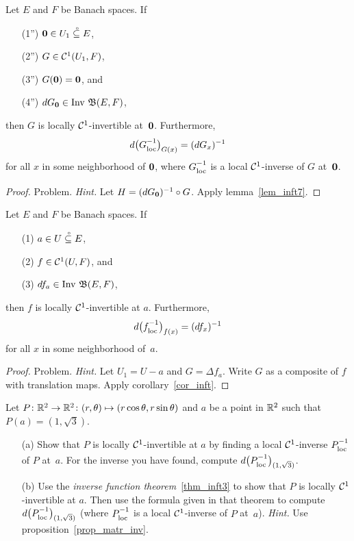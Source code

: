 \begin{cor}\label{cor_inft}
Let $E$ and $F$ be Banach spaces. If
 \begin{enumerate}
  \item[(1'')] $\mathbf{0} \in U_1\overset{\thickspace{}_\circ}{\subseteq}E$,
  \item[(2'')] $G \in \mathcal{C}^1(U_1,F)$,
  \item[(3'')] $G(\mathbf{0}) = \mathbf{0}$, and
  \item[(4'')] $dG_{\mathbf{0}} \in \operatorname{Inv}\,\mathfrak{B}(E,F)$,
 \end{enumerate}
then $G$ is locally $\mathcal{C}^1$-invertible at~$\mathbf{0}$.  Furthermore,
  \[ d\bigl(G_{\mathstrut\text{loc}}^{\mathstrut{-1}}\bigr)_{G(x)} = (dG_x)^{-1} \]
for all $x$ in some neighborhood of $\mathbf{0}$, where $G_{\mathstrut\text{loc}}^{\mathstrut{-1}}$ is a local $\mathcal{C}^1$-inverse
of $G$ at~$\mathbf{0}$.
\end{cor}

\begin{proof} Problem. \emph{Hint.}  Let $H = (dG_{\mathbf{0}})^{-1} \circ G$. Apply lemma~\ref{lem_inft7}.
\ns
\end{proof}

\begin{thm}\label{thm_inft3} Let $E$ and
$F$ be Banach spaces.  If
 \begin{enumerate}
  \item[(1)] $a \in U\overset{\thickspace{}_\circ}{\subseteq}E$,
  \item[(2)] $f \in \mathcal{C}^1(U,F)$, and
  \item[(3)] $df_a \in \operatorname{Inv}\,\mathfrak{B}(E,F)$,
 \end{enumerate}
then $f$ is locally $\mathcal{C}^1$-invertible at $a$.  Furthermore,
  \[ d\bigl(f_{\mathstrut\text{loc}}^{\mathstrut{-1}}\bigr)_{f(x)} = (df_x)^{-1} \]
for all $x$ in some neighborhood of~$a$.
\end{thm}

\begin{proof}  Problem.    \emph{Hint.}   Let $U_1 = U - a$ and $G = \Delta f_a$.  Write $G$ as a
composite of $f$ with translation maps.  Apply corollary~\ref{cor_inft}.   \ns
\end{proof}

\begin{prob} Let $P \colon \mathbb{R}^2 \rightarrow \mathbb{R}^2 \colon (r,\theta) \mapsto (r\cos\theta, r\sin\theta)$
and $a$ be a point in $\mathbb{R}^2$ such that $P(a) = (1, \sqrt 3)$.
 \begin{enumerate}
  \item[(a)] Show that $P$ is locally $\mathcal{C}^1$-invertible at $a$ by finding a local $\mathcal{C}^1$-inverse $P_{\mathstrut\text{loc}}^{\mathstrut{-1}}$ of $P$ at~$a$.  For the inverse you have found, compute
$d\bigl(P_{\mathstrut\text{loc}}^{\mathstrut{-1}}\bigr)_{(1,\sqrt 3)}$.
  \item[(b)] Use the \emph{inverse function theorem}~\ref{thm_inft3} to show that $P$ is locally
$\mathcal{C}^1$-invertible at $a$.  Then use the formula given in that theorem to compute
$d\bigl(P_{\mathstrut\text{loc}}^{\mathstrut{-1}}\bigr)_{(1,\sqrt 3)}$ (where $P_{\mathstrut\text{loc}}^{\mathstrut{-1}}$ is a local $\mathcal{C}^1$-inverse of $P$
at~$a$).  \emph{Hint.}  Use proposition~\ref{prop_matr_inv}.
 \end{enumerate}
\end{prob}

